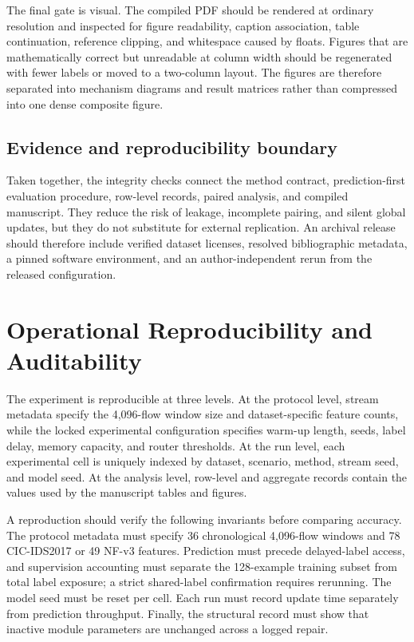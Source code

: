 The final gate is visual. The compiled PDF should be rendered at ordinary resolution and inspected for figure readability, caption association, table continuation, reference clipping, and whitespace caused by floats. Figures that are mathematically correct but unreadable at column width should be regenerated with fewer labels or moved to a two-column layout. The figures are therefore separated into mechanism diagrams and result matrices rather than compressed into one dense composite figure.

\subsection{Evidence and reproducibility boundary}
Taken together, the integrity checks connect the method contract, prediction-first evaluation procedure, row-level records, paired analysis, and compiled manuscript. They reduce the risk of leakage, incomplete pairing, and silent global updates, but they do not substitute for external replication. An archival release should therefore include verified dataset licenses, resolved bibliographic metadata, a pinned software environment, and an author-independent rerun from the released configuration.

\section{Operational Reproducibility and Auditability}
\label{sec:reproducibility-expanded}

The experiment is reproducible at three levels. At the protocol level, stream metadata specify the 4,096-flow window size and dataset-specific feature counts, while the locked experimental configuration specifies warm-up length, seeds, label delay, memory capacity, and router thresholds. At the run level, each experimental cell is uniquely indexed by dataset, scenario, method, stream seed, and model seed. At the analysis level, row-level and aggregate records contain the values used by the manuscript tables and figures.

A reproduction should verify the following invariants before comparing accuracy. The protocol metadata must specify 36 chronological 4,096-flow windows and 78 CIC-IDS2017 or 49 NF-v3 features. Prediction must precede delayed-label access, and supervision accounting must separate the 128-example training subset from total label exposure; a strict shared-label confirmation requires rerunning. The model seed must be reset per cell. Each run must record update time separately from prediction throughput. Finally, the structural record must show that inactive module parameters are unchanged across a logged repair.

